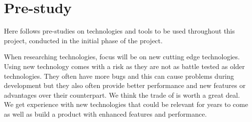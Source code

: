\chapter{Pre-study}

Here follows pre-studies on technologies and tools to be used throughout this project, conducted in the initial phase of the project.

When researching technologies, focus will be on new cutting edge technologies. Using new technology comes with a risk as they are not as battle tested as older technologies. They often have more bugs and this can cause problems during development but they also often provide better performance and new features or advantages over their counterpart. We think the trade of is worth a great deal. We get experience with new technologies that could be relevant for years to come as well as build a product with enhanced features and performance.








